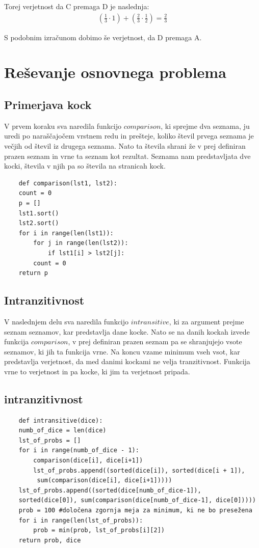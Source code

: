 \documentclass[12pt,a4paper]{amsart}
\begin{document}
Torej verjetnost da C premaga D je naslednja:
\begin{align*}
    (\frac{1}{3}\cdot 1)+(\frac{2}{3}\cdot\frac{1}{2}) = \frac{2}{3}
\end{align*}

S podobnim izračunom dobimo še verjetnost, da D premaga A.


\section{Reševanje osnovnega problema}
\subsection{Primerjava kock}
V prvem koraku sva naredila funkcijo $comparison$, ki \linebreak
sprejme dva seznama, ju uredi po naraščajočem vrstnem redu in prešteje, koliko števil prvega seznama je večjih od števil iz drugega seznama. Nato ta števila shrani že 
v prej definiran prazen seznam in vrne ta seznam kot rezultat.
Seznama nam predstavljata dve kocki, števila v njih pa so števila na stranicah kock.
 \begin{verbatim}
    def comparison(lst1, lst2):
    count = 0
    p = []
    lst1.sort()
    lst2.sort()
    for i in range(len(lst1)):
        for j in range(len(lst2)):
            if lst1[i] > lst2[j]:
        count = 0 
    return p
 \end{verbatim}
 \subsection{Intranzitivnost}
 V naslednjem delu sva naredila funkcijo $intransitive$, ki za argument prejme seznam seznamov, kar predstavlja dane kocke.
 Nato se na danih kockah izvede funkcija $comparison$, v prej definiran prazen seznam pa se shranjujejo vsote seznamov, ki jih ta funkcija vrne.
 Na koncu vzame minimum vseh vsot, kar predstavlja verjetnost, da med danimi kockami ne velja tranzitivnost. Funkcija vrne to verjetnost in pa kocke, ki jim ta verjetnost pripada.
 \subsection{intranzitivnost}
 \begin{verbatim}
    def intransitive(dice):
    numb_of_dice = len(dice)
    lst_of_probs = []
    for i in range(numb_of_dice - 1):
        comparison(dice[i], dice[i+1])
        lst_of_probs.append((sorted(dice[i]), sorted(dice[i + 1]),
         sum(comparison(dice[i], dice[i+1]))))
    lst_of_probs.append((sorted(dice[numb_of_dice-1]), 
    sorted(dice[0]), sum(comparison(dice[numb_of_dice-1], dice[0]))))
    prob = 100 #določena zgornja meja za minimum, ki ne bo presežena
    for i in range(len(lst_of_probs)):
        prob = min(prob, lst_of_probs[i][2])
    return prob, dice
 \end{verbatim}
\end{document}
